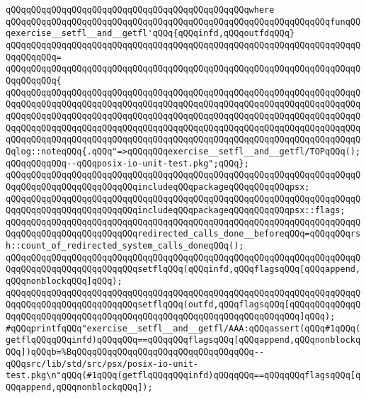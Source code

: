 \verb|qQQqqQQqqQQqqQQqqQQqqQQqqQQqqQQqqQQqqQQqqQQqqQQqwhere|\newline
\verb|qQQqqQQqqQQqqQQqqQQqqQQqqQQqqQQqqQQqqQQqqQQqqQQqqQQqqQQqqQQqqQQqfunqQQqexercise__setfl__and__getfl'qQQq{qQQqinfd,qQQqoutfdqQQq}|\newline
\verb|qQQqqQQqqQQqqQQqqQQqqQQqqQQqqQQqqQQqqQQqqQQqqQQqqQQqqQQqqQQqqQQqqQQqqQQqqQQqqQQq=|\newline
\verb|qQQqqQQqqQQqqQQqqQQqqQQqqQQqqQQqqQQqqQQqqQQqqQQqqQQqqQQqqQQqqQQqqQQqqQQqqQQqqQQq{|\newline
\verb|qQQqqQQqqQQqqQQqqQQqqQQqqQQqqQQqqQQqqQQqqQQqqQQqqQQqqQQqqQQqqQQqqQQqqQQqqQQqqQQqqQQqqQQqqQQqqQQqqQQqqQQqqQQqqQQqqQQqqQQqqQQqqQQqqQQqqQQqqQQqqQQqqQQqqQQqqQQqqQQqqQQqqQQqqQQqqQQqqQQqqQQqqQQqqQQqqQQqqQQqqQQqqQQqqQQqqQQqqQQqqQQqqQQqqQQqqQQqqQQqqQQqqQQqqQQqqQQqqQQqqQQqqQQqqQQqqQQqqQQqqQQqqQQqqQQqqQQqqQQqqQQqqQQqqQQqqQQqqQQqqQQqqQQqqQQqqQQqqQQqqQQqqQQqqQQqlog::noteqQQq{.qQQq"=>qQQqqQQqexercise__setfl__and__getfl/TOPqQQq();qQQqqQQqqQQq--qQQqposix-io-unit-test.pkg";qQQq};|\newline
\verb|qQQqqQQqqQQqqQQqqQQqqQQqqQQqqQQqqQQqqQQqqQQqqQQqqQQqqQQqqQQqqQQqqQQqqQQqqQQqqQQqqQQqqQQqqQQqqQQqincludeqQQqpackageqQQqqQQqqQQqpsx;|\newline
\verb|qQQqqQQqqQQqqQQqqQQqqQQqqQQqqQQqqQQqqQQqqQQqqQQqqQQqqQQqqQQqqQQqqQQqqQQqqQQqqQQqqQQqqQQqqQQqqQQqincludeqQQqpackageqQQqqQQqqQQqpsx::flags;|\newline
\newline
\verb|qQQqqQQqqQQqqQQqqQQqqQQqqQQqqQQqqQQqqQQqqQQqqQQqqQQqqQQqqQQqqQQqqQQqqQQqqQQqqQQqqQQqqQQqqQQqqQQqredirected_calls_done__beforeqQQq=qQQqqQQqrsh::count_of_redirected_system_calls_doneqQQq();|\newline
\newline
\verb|qQQqqQQqqQQqqQQqqQQqqQQqqQQqqQQqqQQqqQQqqQQqqQQqqQQqqQQqqQQqqQQqqQQqqQQqqQQqqQQqqQQqqQQqqQQqqQQqsetflqQQq(qQQqinfd,qQQqflagsqQQq[qQQqappend,qQQqnonblockqQQq]qQQq);|\newline
\verb|qQQqqQQqqQQqqQQqqQQqqQQqqQQqqQQqqQQqqQQqqQQqqQQqqQQqqQQqqQQqqQQqqQQqqQQqqQQqqQQqqQQqqQQqqQQqqQQqsetflqQQq(outfd,qQQqflagsqQQq[qQQqqQQqqQQqqQQqqQQqqQQqqQQqqQQqqQQqqQQqqQQqqQQqqQQqqQQqqQQqqQQqqQQqqQQq]qQQq);|\newline
\newline
\verb|#qQQqprintfqQQq"exercise__setfl__and__getfl/AAA:qQQqassert(qQQq#1qQQq(getflqQQqqQQqinfd)qQQqqQQq==qQQqqQQqflagsqQQq[qQQqappend,qQQqnonblockqQQq])qQQqb=%BqQQqqQQqqQQqqQQqqQQqqQQqqQQqqQQqqQQq--qQQqsrc/lib/std/src/psx/posix-io-unit-test.pkg\n"qQQq(#1qQQq(getflqQQqqQQqinfd)qQQqqQQq==qQQqqQQqflagsqQQq[qQQqappend,qQQqnonblockqQQq]);|\newline
